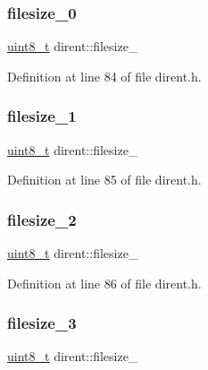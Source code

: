 \mbox{\label{structdirent_a5c92b50341a3ea3a3e1592d1aebd23ab}} 
\subsubsection{\texorpdfstring{filesize\_0}{filesize\_0}}
{\footnotesize\ttfamily \mbox{\hyperlink{stdint_8h_aba7bc1797add20fe3efdf37ced1182c5}{uint8\+\_\+t}} dirent\+::filesize\+\_}



Definition at line 84 of file dirent.\+h.

\mbox{\label{structdirent_ab83bd6825f6eff5f1924f84e086c67c3}} 
\subsubsection{\texorpdfstring{filesize\_1}{filesize\_1}}
{\footnotesize\ttfamily \mbox{\hyperlink{stdint_8h_aba7bc1797add20fe3efdf37ced1182c5}{uint8\+\_\+t}} dirent\+::filesize\+\_}



Definition at line 85 of file dirent.\+h.

\mbox{\label{structdirent_a0a0446c959c75fe5da05c7f8f268e0f2}} 
\subsubsection{\texorpdfstring{filesize\_2}{filesize\_2}}
{\footnotesize\ttfamily \mbox{\hyperlink{stdint_8h_aba7bc1797add20fe3efdf37ced1182c5}{uint8\+\_\+t}} dirent\+::filesize\+\_}



Definition at line 86 of file dirent.\+h.

\mbox{\label{structdirent_a331c8de304895a4ca3a0ab0388a3dce2}} 
\subsubsection{\texorpdfstring{filesize\_3}{filesize\_3}}
{\footnotesize\ttfamily \mbox{\hyperlink{stdint_8h_aba7bc1797add20fe3efdf37ced1182c5}{uint8\+\_\+t}} dirent\+::filesize\+\_}




